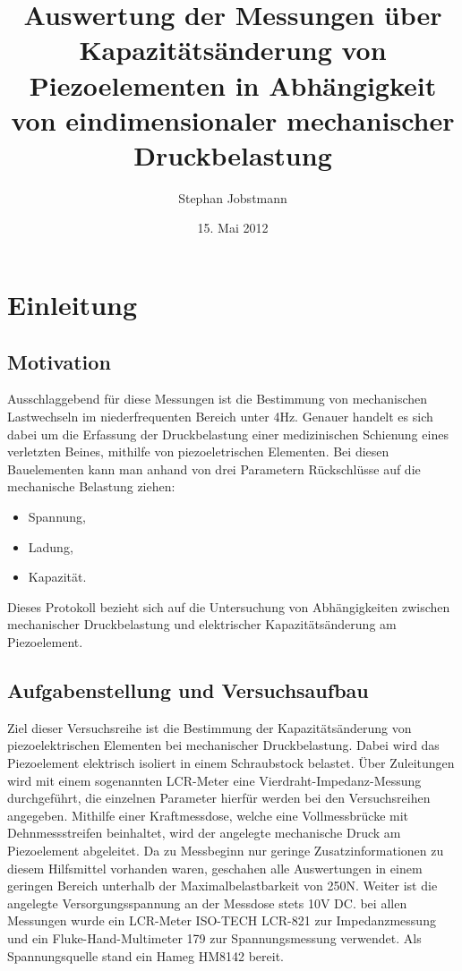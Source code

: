 \documentclass[11pt]{scrreprt} %
\title{Auswertung der Messungen über Kapazitätsänderung von Piezoelementen in Abhängigkeit von  eindimensionaler mechanischer Druckbelastung}
\author{Stephan Jobstmann}
\date {15. Mai 2012}
\begin{document}
\maketitle
\tableofcontents
\def\chapterpagestyle{fancy}
\chapter{Einleitung}

\section{Motivation}

Ausschlaggebend für diese Messungen ist die Bestimmung von mechanischen Lastwechseln im niederfrequenten Bereich unter 4Hz. Genauer handelt es sich dabei um die Erfassung der Druckbelastung einer medizinischen Schienung eines verletzten Beines, mithilfe von piezoeletrischen Elementen. Bei diesen Bauelementen kann man anhand von drei Parametern Rückschlüsse auf die mechanische Belastung ziehen:
\begin{itemize}
\item Spannung,
\item Ladung,
\item Kapazität.
\end{itemize}
Dieses Protokoll bezieht sich auf die Untersuchung von Abhängigkeiten zwischen mechanischer Druckbelastung und elektrischer Kapazitätsänderung am Piezoelement.
\section{Aufgabenstellung und Versuchsaufbau}

Ziel dieser Versuchsreihe ist die Bestimmung der Kapazitätsänderung von piezoelektrischen Elementen bei mechanischer Druckbelastung. Dabei wird das Piezoelement elektrisch isoliert in einem Schraubstock belastet. Über Zuleitungen wird mit einem sogenannten LCR-Meter eine Vierdraht-Impedanz-Messung durchgeführt, die einzelnen Parameter hierfür werden bei den Versuchsreihen angegeben. Mithilfe einer Kraftmessdose, welche eine Vollmessbrücke mit Dehnmessstreifen beinhaltet, wird der angelegte mechanische Druck am Piezoelement abgeleitet. Da zu Messbeginn nur geringe Zusatzinformationen zu diesem Hilfsmittel vorhanden waren, geschahen alle Auswertungen in einem geringen Bereich unterhalb der Maximalbelastbarkeit von 250N. Weiter ist die angelegte Versorgungsspannung an der Messdose stets 10V DC. bei allen Messungen wurde ein LCR-Meter ISO-TECH LCR-821 zur Impedanzmessung und ein Fluke-Hand-Multimeter 179 zur Spannungsmessung verwendet. Als Spannungsquelle stand ein Hameg HM8142 bereit.
\end{document}
